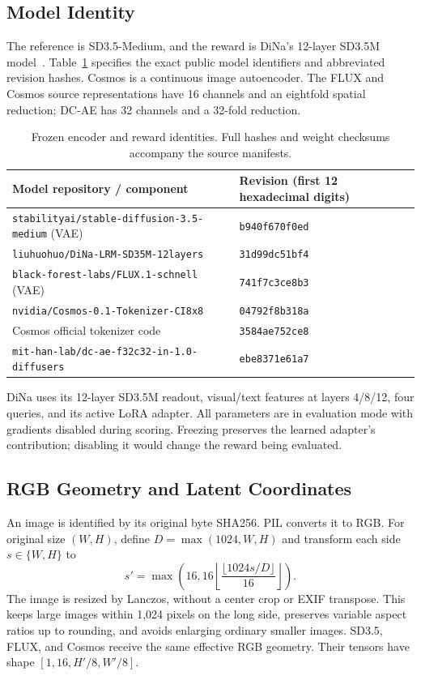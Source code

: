 \documentclass[10pt,twocolumn,letterpaper]{article}
\begin{document}
\subsection{Model Identity}
The reference is SD3.5-Medium, and the reward is DiNa's 12-layer SD3.5M model~\cite{liu2026beyond}. Table~\ref{tab:models} specifies the exact public model identifiers and abbreviated revision hashes. Cosmos is a continuous image autoencoder. The FLUX and Cosmos source representations have 16 channels and an eightfold spatial reduction; DC-AE has 32 channels and a 32-fold reduction.

\begin{table}[t]\centering\small
\begin{tabular}{ll}
\toprule
Model repository / component & Revision (first 12 hexadecimal digits)\\
\midrule
\texttt{stabilityai/stable-diffusion-3.5-medium} (VAE) &\texttt{b940f670f0ed}\\
\texttt{liuhuohuo/DiNa-LRM-SD35M-12layers} &\texttt{31d99dc51bf4}\\
\texttt{black-forest-labs/FLUX.1-schnell} (VAE) &\texttt{741f7c3ce8b3}\\
\texttt{nvidia/Cosmos-0.1-Tokenizer-CI8x8} &\texttt{04792f8b318a}\\
Cosmos official tokenizer code &\texttt{3584ae752ce8}\\
\texttt{mit-han-lab/dc-ae-f32c32-in-1.0-diffusers} &\texttt{ebe8371e61a7}\\
\bottomrule
\end{tabular}
\caption{Frozen encoder and reward identities. Full hashes and weight checksums accompany the source manifests.}
\label{tab:models}\end{table}

DiNa uses its 12-layer SD3.5M readout, visual/text features at layers 4/8/12, four queries, and its active LoRA adapter. All parameters are in evaluation mode with gradients disabled during scoring. Freezing preserves the learned adapter's contribution; disabling it would change the reward being evaluated.

\subsection{RGB Geometry and Latent Coordinates}
An image is identified by its original byte SHA256. PIL converts it to RGB. For original size $(W,H)$, define $D=\max(1024,W,H)$ and transform each side $s\in\{W,H\}$ to
\begin{equation}
 s'=\max\!\left(16,16\left\lfloor\frac{\lfloor1024s/D\rfloor}{16}\right\rfloor\right).
\end{equation}
The image is resized by Lanczos, without a center crop or EXIF transpose. This keeps large images within 1,024 pixels on the long side, preserves variable aspect ratios up to rounding, and avoids enlarging ordinary smaller images. SD3.5, FLUX, and Cosmos receive the same effective RGB geometry. Their tensors have shape $[1,16,H'/8,W'/8]$.
\end{document}
